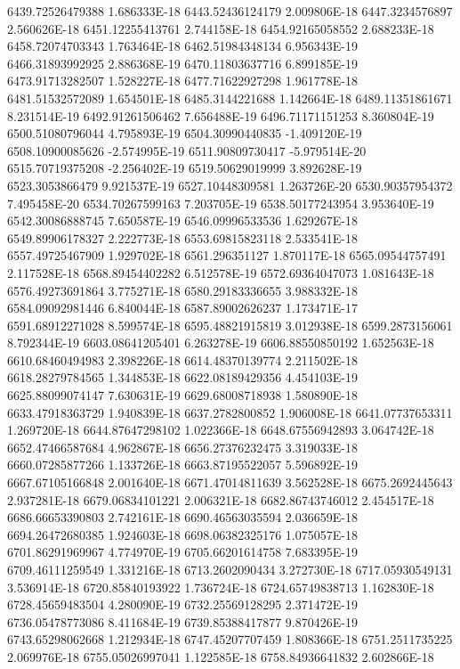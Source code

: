 6439.72526479388  1.686333E-18
6443.52436124179  2.009806E-18
6447.3234576897  2.560626E-18
6451.12255413761  2.744158E-18
6454.92165058552  2.688233E-18
6458.72074703343  1.763464E-18
6462.51984348134  6.956343E-19
6466.31893992925  2.886368E-19
6470.11803637716  6.899185E-19
6473.91713282507  1.528227E-18
6477.71622927298  1.961778E-18
6481.51532572089  1.654501E-18
6485.3144221688  1.142664E-18
6489.11351861671  8.231514E-19
6492.91261506462  7.656488E-19
6496.71171151253  8.360804E-19
6500.51080796044  4.795893E-19
6504.30990440835  -1.409120E-19
6508.10900085626  -2.574995E-19
6511.90809730417  -5.979514E-20
6515.70719375208  -2.256402E-19
6519.50629019999  3.892628E-19
6523.3053866479  9.921537E-19
6527.10448309581  1.263726E-20
6530.90357954372  7.495458E-20
6534.70267599163  7.203705E-19
6538.50177243954  3.953640E-19
6542.30086888745  7.650587E-19
6546.09996533536  1.629267E-18
6549.89906178327  2.222773E-18
6553.69815823118  2.533541E-18
6557.49725467909  1.929702E-18
6561.296351127  1.870117E-18
6565.09544757491  2.117528E-18
6568.89454402282  6.512578E-19
6572.69364047073  1.081643E-18
6576.49273691864  3.775271E-18
6580.29183336655  3.988332E-18
6584.09092981446  6.840044E-18
6587.89002626237  1.173471E-17
6591.68912271028  8.599574E-18
6595.48821915819  3.012938E-18
6599.2873156061  8.792344E-19
6603.08641205401  6.263278E-19
6606.88550850192  1.652563E-18
6610.68460494983  2.398226E-18
6614.48370139774  2.211502E-18
6618.28279784565  1.344853E-18
6622.08189429356  4.454103E-19
6625.88099074147  7.630631E-19
6629.68008718938  1.580890E-18
6633.47918363729  1.940839E-18
6637.2782800852  1.906008E-18
6641.07737653311  1.269720E-18
6644.87647298102  1.022366E-18
6648.67556942893  3.064742E-18
6652.47466587684  4.962867E-18
6656.27376232475  3.319033E-18
6660.07285877266  1.133726E-18
6663.87195522057  5.596892E-19
6667.67105166848  2.001640E-18
6671.47014811639  3.562528E-18
6675.2692445643  2.937281E-18
6679.06834101221  2.006321E-18
6682.86743746012  2.454517E-18
6686.66653390803  2.742161E-18
6690.46563035594  2.036659E-18
6694.26472680385  1.924603E-18
6698.06382325176  1.075057E-18
6701.86291969967  4.774970E-19
6705.66201614758  7.683395E-19
6709.46111259549  1.331216E-18
6713.2602090434  3.272730E-18
6717.05930549131  3.536914E-18
6720.85840193922  1.736724E-18
6724.65749838713  1.162830E-18
6728.45659483504  4.280090E-19
6732.25569128295  2.371472E-19
6736.05478773086  8.411684E-19
6739.85388417877  9.870426E-19
6743.65298062668  1.212934E-18
6747.45207707459  1.808366E-18
6751.2511735225  2.069976E-18
6755.05026997041  1.122585E-18
6758.84936641832  2.602866E-18
